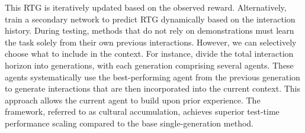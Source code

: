 \documentclass{article}
\begin{document}
This RTG is iteratively updated based on the observed reward.
Alternatively, \citet{daiContextExplorationExploitationReinforcement2024} train a secondary network to predict RTG dynamically based on the interaction history.
During testing, methods that do not rely on demonstrations must learn the task solely from their own previous interactions. However, we can selectively choose what to include in the context. For instance, \citet{cookArtificialGenerationalIntelligence2024} divide the total interaction horizon into generations, with each generation comprising several agents. These agents systematically use the best-performing agent from the previous generation to generate interactions that are then incorporated into the current context. This approach allows the current agent to build upon prior experience. The framework, referred to as cultural accumulation, achieves superior test-time performance scaling compared to the base single-generation method.
\end{document}
